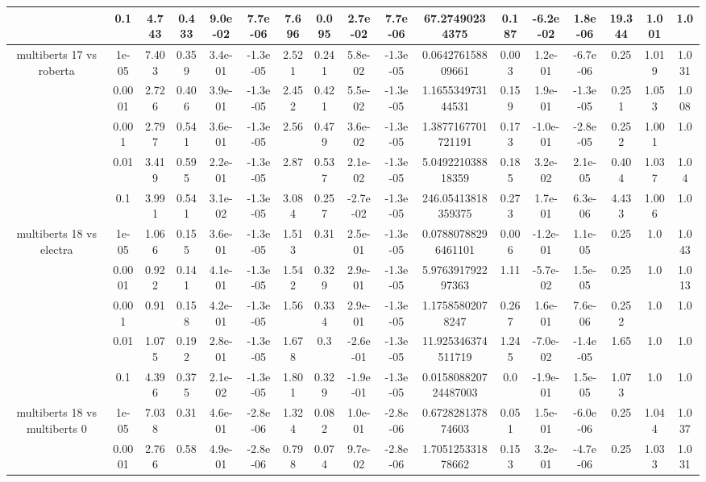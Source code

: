 \begin{tabular}{|c|c|c|c|c|c|c|c|c|c|c|c|c|c|c|c|c|}
 & 0.1 & 4.743 & 0.433 & 9.0e-02 & 7.7e-06 & 7.696 & 0.095 & 2.7e-02 & 7.7e-06 & 67.27490234375 & 0.187 & -6.2e-02 & 1.8e-06 & 19.344 & 1.001 & 1.0 \\
\hline
\multirow{5}{*}{multiberts 17 vs roberta } & 1e-05 & 7.403 & 0.359 & 3.4e-01 & -1.3e-05 & 2.521 & 0.241 & 5.8e-02 & -1.3e-05 & 0.064276158809661 & 0.003 & 1.2e-01 & -6.7e-06 & 0.25 & 1.019 & 1.031 \\
 & 0.0001 & 2.726 & 0.406 & 3.9e-01 & -1.3e-05 & 2.452 & 0.421 & 5.5e-02 & -1.3e-05 & 1.165534973144531 & 0.159 & 1.9e-01 & -1.3e-05 & 0.251 & 1.053 & 1.008 \\
 & 0.001 & 2.797 & 0.541 & 3.6e-01 & -1.3e-05 & 2.56 & 0.479 & 3.6e-02 & -1.3e-05 & 1.3877167701721191 & 0.173 & -1.0e-01 & -2.8e-05 & 0.252 & 1.001 & 1.0 \\
 & 0.01 & 3.419 & 0.595 & 2.2e-01 & -1.3e-05 & 2.87 & 0.537 & 2.1e-02 & -1.3e-05 & 5.049221038818359 & 0.185 & 3.2e-02 & 2.1e-05 & 0.404 & 1.037 & 1.04 \\
 & 0.1 & 3.991 & 0.541 & 3.1e-02 & -1.3e-05 & 3.084 & 0.257 & -2.7e-02 & -1.3e-05 & 246.05413818359375 & 0.273 & 1.7e-01 & 6.3e-06 & 4.433 & 1.006 & 1.0 \\
\hline
\multirow{5}{*}{multiberts 18 vs electra } & 1e-05 & 1.066 & 0.155 & 3.6e-01 & -1.3e-05 & 1.513 & 0.31 & 2.5e-01 & -1.3e-05 & 0.07880788296461101 & 0.006 & -1.2e-01 & 1.1e-05 & 0.25 & 1.0 & 1.043 \\
 & 0.0001 & 0.922 & 0.141 & 4.1e-01 & -1.3e-05 & 1.542 & 0.329 & 2.9e-01 & -1.3e-05 & 5.976391792297363 & 1.11 & -5.7e-02 & 1.5e-05 & 0.25 & 1.0 & 1.013 \\
 & 0.001 & 0.91 & 0.158 & 4.2e-01 & -1.3e-05 & 1.56 & 0.334 & 2.9e-01 & -1.3e-05 & 1.17585802078247 & 0.267 & 1.6e-01 & 7.6e-06 & 0.252 & 1.0 & 1.0 \\
 & 0.01 & 1.075 & 0.192 & 2.8e-01 & -1.3e-05 & 1.678 & 0.3 & -2.6e-01 & -1.3e-05 & 11.925346374511719 & 1.245 & -7.0e-02 & -1.4e-05 & 1.65 & 1.0 & 1.0 \\
 & 0.1 & 4.396 & 0.375 & 2.1e-02 & -1.3e-05 & 1.801 & 0.329 & -1.9e-01 & -1.3e-05 & 0.015808820724487003 & 0.0 & -1.9e-01 & 1.5e-05 & 1.073 & 1.0 & 1.0 \\
\hline
\multirow{5}{*}{multiberts 18 vs multiberts 0} & 1e-05 & 7.038 & 0.31 & 4.6e-01 & -2.8e-06 & 1.324 & 0.082 & 1.0e-01 & -2.8e-06 & 0.672828137874603 & 0.051 & 1.5e-01 & -6.0e-06 & 0.25 & 1.044 & 1.037 \\
 & 0.0001 & 2.766 & 0.58 & 4.9e-01 & -2.8e-06 & 0.798 & 0.074 & 9.7e-02 & -2.8e-06 & 1.705125331878662 & 0.153 & 3.2e-01 & -4.7e-06 & 0.25 & 1.033 & 1.031 \\

\end{tabular}
